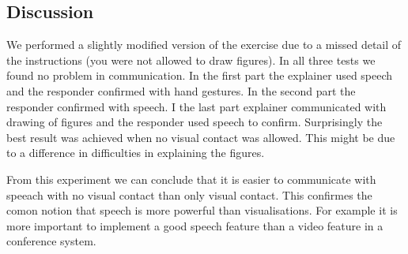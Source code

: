\documentclass[10pt, a4paper]{article}
\begin{document}
\subsection{Discussion}
We performed a slightly modified version of the exercise due to a missed detail of the instructions (you were not allowed to draw figures). In all three tests we found no problem in communication. In the first part the explainer used speech and the responder confirmed with hand gestures. In the second part the responder confirmed with speech. I the last part explainer communicated with drawing of figures and the responder used speech to confirm. Surprisingly the best result was achieved when no visual contact was allowed. This might be due to a difference in difficulties in explaining the figures.

From this experiment we can conclude that it is easier to communicate with speeach with no visual contact than only visual contact. This confirmes the comon notion that speech is more powerful than visualisations. For example it is more important to implement a good speech feature than a video feature in a conference system.

%
%
\end{document}
